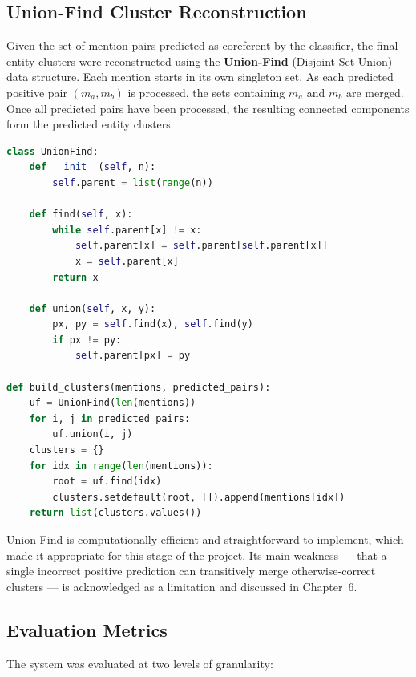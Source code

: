 \documentclass[12pt,a4paper]{report}
\begin{document}
\subsection{Union-Find Cluster Reconstruction}

Given the set of mention pairs predicted as coreferent by the classifier, the final entity clusters were reconstructed using the \textbf{Union-Find} (Disjoint Set Union) data structure. Each mention starts in its own singleton set. As each predicted positive pair $(m_a, m_b)$ is processed, the sets containing $m_a$ and $m_b$ are merged. Once all predicted pairs have been processed, the resulting connected components form the predicted entity clusters.

\begin{lstlisting}[language=Python, caption={Union-Find Cluster Reconstruction}]
class UnionFind:
    def __init__(self, n):
        self.parent = list(range(n))

    def find(self, x):
        while self.parent[x] != x:
            self.parent[x] = self.parent[self.parent[x]]
            x = self.parent[x]
        return x

    def union(self, x, y):
        px, py = self.find(x), self.find(y)
        if px != py:
            self.parent[px] = py

def build_clusters(mentions, predicted_pairs):
    uf = UnionFind(len(mentions))
    for i, j in predicted_pairs:
        uf.union(i, j)
    clusters = {}
    for idx in range(len(mentions)):
        root = uf.find(idx)
        clusters.setdefault(root, []).append(mentions[idx])
    return list(clusters.values())
\end{lstlisting}

\noindent Union-Find is computationally efficient and straightforward to implement, which made it appropriate for this stage of the project. Its main weakness --- that a single incorrect positive prediction can transitively merge otherwise-correct clusters --- is acknowledged as a limitation and discussed in Chapter~6.

\subsection{Evaluation Metrics}

The system was evaluated at two levels of granularity:
\end{document}
